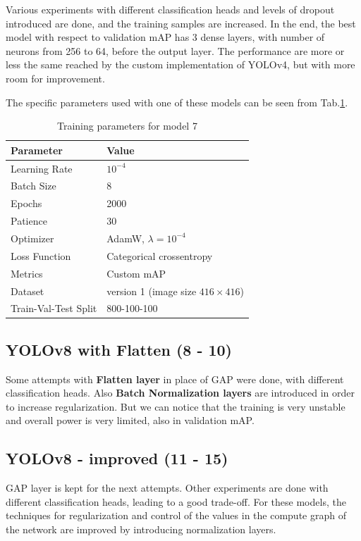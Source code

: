 \documentclass[a4paper,12pt]{article}
\begin{document}
Various experiments with different classification heads and levels of dropout introduced are done, and the training samples are increased. In the end, the best model with respect to validation mAP has 3 dense layers, with number of neurons from 256 to 64, before the output layer. The performance are more or less the same reached by the custom implementation of YOLOv4, but with more room for improvement.

The specific parameters used with one of these models can be seen from Tab.\ref{tab:training-params-yolov8-1}.

\begin{table}[h]
	\centering
	\begin{tabular}{ll}
		\toprule
		\textbf{Parameter} & \textbf{Value} \\
		\midrule
		Learning Rate & $ 10^{-4} $ \\
		Batch Size & 8 \\
		Epochs & 2000 \\
		Patience & 30 \\
		Optimizer & AdamW, $\lambda=10^{-4}$ \\
		Loss Function & Categorical crossentropy\\
		Metrics & Custom mAP \\
		Dataset & version 1 (image size $ 416 \times 416 $) \\
		Train-Val-Test Split & 800-100-100 \\
		\bottomrule
	\end{tabular}
	\caption{Training parameters for model 7}
	\label{tab:training-params-yolov8-1}
\end{table}


\subsection{YOLOv8 with Flatten (8 - 10)}
Some attempts with \textbf{Flatten layer} in place of GAP were done, with different classification heads. Also \textbf{Batch Normalization layers} are introduced in order to increase regularization. But we can notice that the training is very unstable and overall power is very limited, also in validation mAP.

\subsection{YOLOv8 - improved (11 - 15)}
GAP layer is kept for the next attempts. Other experiments are done with different classification heads, leading to a good trade-off. For these models, the techniques for regularization and control of the values in the compute graph of the network are improved by introducing normalization layers.
\end{document}
